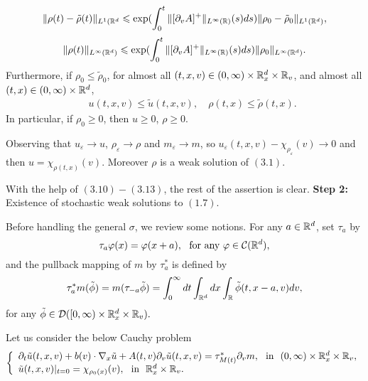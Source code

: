 \documentclass[11pt]{article}
\def\geq{\geqslant}\def\leq{\leqslant}
\begin{document}
\begin{eqnarray}\label{3.21}
\|\rho(t)-\tilde{\rho}(t)\|_{L^1(\mR^d}\leq
\exp(\int^t_0\|[\partial_vA]^+\|_{L^\infty(\mR)}(s)ds)
\|\rho_0-\tilde{\rho}_0\|_{L^1(\mR^d)},
\end{eqnarray}
\begin{eqnarray}\label{3.22}
\|\rho(t)\|_{L^\infty(\mR^d)}\leq
\exp(\int^t_0\|[\partial_vA]^+\|_{L^\infty(\mR)}(s)ds)
\|\rho_0\|_{L^\infty(\mR^d)}.
\end{eqnarray}
Furthermore, if $\rho_0\leq \tilde{\rho}_0$, for almost all
$(t,x,v)\in (0,\infty)\times{\mathbb R}^d_x\times {\mathbb R}_v$, and almost all
$(t,x)\in (0,\infty)\times {\mathbb R}^d$,
\begin{eqnarray}\label{3.23}
&& u(t,x,v)\leq\tilde{u}(t,x,v), \quad \rho(t,x)\leq
\tilde{\rho}(t,x) .
\end{eqnarray}
In particular, if
$\rho_0\geq 0$, then $u\geq 0$, $\rho\geq 0$.
 \vskip1mm\par
Observing that $u_\varepsilon\rightarrow u$,
$\rho_\varepsilon\rightarrow \rho$ and $m_\varepsilon\rightarrow m$,
so $u_\varepsilon(t,x,v)-\chi_{\rho_\varepsilon}(v)\rightarrow 0$
and then $u=\chi_{\rho(t,x)}(v)$. Moreover $\rho$ is a weak solution
of $(3.1)$.
  \vskip1mm\par
With the help of $(3.10)-(3.13)$, the rest of the assertion is
clear.
 \vskip2mm\noindent
\textbf{Step 2:} Existence of stochastic weak solutions to $(1.7)$.
 \vskip1mm\par
Before handling the general $\sigma$, we review some notions. For
any $a\in{\mathbb R}^d$, set $\tau_a$ by
$$
\tau_a\varphi(x)=\varphi(x+a), \ \ \mbox{for any} \ \varphi\in
\cC(\mR^d),
$$
and the pullback mapping of $m$ by $\tau^{*}_a$ is defined by
$$
\tau^{*}_am(\tilde{\phi})=m(\tau_{-a}\tilde{\phi})=\int_0^\infty
dt\int_{{\mathbb R}^d}dx\int_{{\mathbb R}}\tilde{\phi}(t,x-a,v)dv,
$$
for any $\tilde{\phi}\in {\mathcal D}([0,\infty)\times {\mathbb R}^d_x
\times {\mathbb R}_v).$
  \vskip2mm\par
Let us consider the below Cauchy problem
\begin{eqnarray}\label{3.24}
\left\{
  \begin{array}{ll}
\partial_t\tilde{u}(t,x,v)+b(v)\cdot\nabla_x\tilde{u}+
A(t,v)\partial_v\tilde{u}(t,x,v) =\tau^{*}_{M(t)}\partial_vm, \ \
\mbox{in} \ \ (0,\infty) \times {\mathbb R}^d_x\times{\mathbb R}_v, \\
 \tilde{u}(t,x,v)|_{t=0}=\chi_{\rho_0(x)}(v), \ \ \mbox{in} \ \
 {\mathbb R}^d_x\times{\mathbb R}_v.
  \end{array}
\right.
\end{eqnarray}
\end{document}
